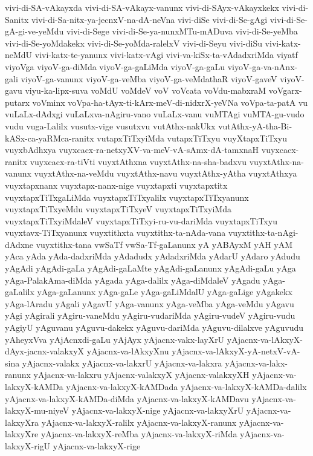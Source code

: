 {vivi-di-SA-vAkayxda
vivi-di-SA-vAkayx-vanunx
vivi-di-SAyx-vAkayxkekx
vivi-di-Sanitx
vivi-di-Sa-nitx-ya-jecnxV-na-dA-neVna
vivi-diSe
vivi-di-Se-gAgi
vivi-di-Se-gA-gi-ve-yeMdu
vivi-di-Sege
vivi-di-Se-ya-nunxMTu-mADuva
vivi-di-Se-yeMba
vivi-di-Se-yoMdakekx
vivi-di-Se-yoMda-ralelxV
vivi-di-Seyu
vivi-diSu
vivi-katx-neMdU
vivi-katx-te-yanunx
vivi-katx-vAgi
vivi-va-kiSx-ta-vAdadxriMda
viyatf
viyoVga
viyoV-ga-diMda
viyoV-ga-gaLiMda
viyoV-ga-gaLu
viyoV-ga-va-nAnx-gali
viyoV-ga-vanunx
viyoV-ga-veMba
viyoV-ga-veMdathaR
viyoV-gaveV
viyoV-gavu
viyu-ka-lipx-suva
voMdU
voMdeV
voV
voVcata
voVdu-mabxraM
voVgarx-putarx
voVminx
voVpa-ha-tAyx-ti-kArx-meV-di-nidxrX-yeVNa
voVpa-ta-patA
vu
vuLaLx-dAdxgi
vuLaLxva-nAgiru-vano
vuLaLx-vanu
vuMTAgi
vuMTA-gu-vudo
vudu
vuga-Lalilx
vusutx-vige
vusutxvu
vutAthx-nakUkx
vutAthx-yA-tha-Bi-kASx-ca-yaRMca-ranitx
vutapxTiTxyiMda
vutapxTiTxyu
vuyXtapxTiTxyu
vuyxbAdhxya
vuyxcacx-ra-netxyXV-va-meV-vA-sAmx-dA-tamxnaH
vuyxcacx-ranitx
vuyxcacx-ra-tiVti
vuyxtAthxna
vuyxtAthx-na-sha-badxvu
vuyxtAthx-na-vanunx
vuyxtAthx-na-veMdu
vuyxtAthx-navu
vuyxtAthx-yAtha
vuyxtAthxya
vuyxtapxnanx
vuyxtapx-nanx-nige
vuyxtapxti
vuyxtapxtitx
vuyxtapxTiTxgaLiMda
vuyxtapxTiTxyalilx
vuyxtapxTiTxyanunx
vuyxtapxTiTxyeMdu
vuyxtapxTiTxyeV
vuyxtapxTiTxyiMda
vuyxtapxTiTxyiMdaleV
vuyxtapxTiTxyi-ru-vu-dariMda
vuyxtapxTiTxyu
vuyxtavx-TiTxyanunx
vuyxtithxta
vuyxtithx-ta-nAda-vana
vuyxtithx-ta-nAgi-dAdxne
vuyxtithx-tana
vwSaTf
vwSa-Tf-gaLanunx
yA
yABAyxM
yAH
yAM
yAca
yAda
yAda-dadxriMda
yAdadudx
yAdadxriMda
yAdarU
yAdaro
yAdudu
yAgAdi
yAgAdi-gaLa
yAgAdi-gaLaMte
yAgAdi-gaLanunx
yAgAdi-gaLu
yAga
yAga-PalakAma-diMda
yAgada
yAga-dalilx
yAga-diMdaleV
yAgadu
yAga-gaLalilx
yAga-gaLanunx
yAga-gaLe
yAga-gaLiMdalU
yAga-gaLige
yAgakekx
yAga-lAradu
yAgali
yAgavU
yAga-vanunx
yAga-veMba
yAga-veMdu
yAgavu
yAgi
yAgirali
yAgiru-vaneMdu
yAgiru-vudariMda
yAgiru-vudeV
yAgiru-vudu
yAgiyU
yAguvanu
yAguvu-dakekx
yAguvu-dariMda
yAguvu-dilalxve
yAguvudu
yAheyxVva
yAjAcnxdi-gaLu
yAjAyx
yAjacnx-vakx-layXrU
yAjacnx-va-lAkxyX-dAyx-jacnx-valakxyX
yAjacnx-va-lAkxyXnu
yAjacnx-va-lAkxyX-yA-netxV-vA-sina
yAjacnx-valakx
yAjacnx-va-lakxrU
yAjacnx-va-lakxra
yAjacnx-va-lakx-ranunx
yAjacnx-va-lakxru
yAjacnx-valakxyX
yAjacnx-valakxyXH
yAjacnx-va-lakxyX-kAMDa
yAjacnx-va-lakxyX-kAMDada
yAjacnx-va-lakxyX-kAMDa-dalilx
yAjacnx-va-lakxyX-kAMDa-diMda
yAjacnx-va-lakxyX-kAMDavu
yAjacnx-va-lakxyX-mu-niyeV
yAjacnx-va-lakxyX-nige
yAjacnx-va-lakxyXrU
yAjacnx-va-lakxyXra
yAjacnx-va-lakxyX-ralilx
yAjacnx-va-lakxyX-ranunx
yAjacnx-va-lakxyXre
yAjacnx-va-lakxyX-reMba
yAjacnx-va-lakxyX-riMda
yAjacnx-va-lakxyX-rigU
yAjacnx-va-lakxyX-rige
}
